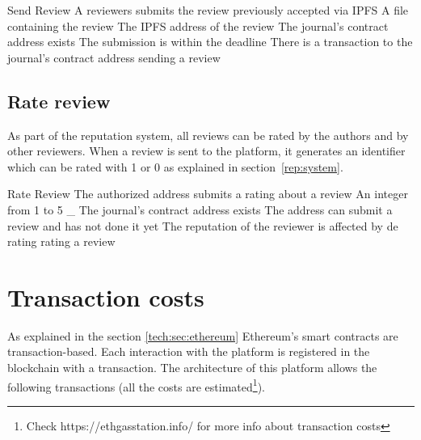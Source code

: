 {Send Review}%
{A reviewers submits the review previously accepted via
  IPFS}%
{A file containing the review}%
{The IPFS address of the review}%
{The journal's contract address exists}%
{The submission is within the deadline}%
{There is a transaction to the journal's contract address}%
{sending a review}%

\subsection*{Rate review}

As part of the reputation system, all reviews can be rated by the authors and by
other reviewers. When a review is sent to the platform, it generates an
identifier which can be rated with 1 or 0 as explained in
section~\ref{rep:system}.

{Rate Review}%
{The authorized address submits a rating about a review}%
{An integer from 1 to 5}%
{_}%
{The journal's contract address exists}%
{The address can submit a review and has not done it yet}%
{The reputation of the reviewer is affected by de rating}%
{rating a review}%
\section{Transaction costs}
\label{arch:trans}

As explained in the section \ref{tech:sec:ethereum} Ethereum's smart contracts
are transaction-based. Each interaction with the platform is registered in the
blockchain with a transaction. The architecture of this platform allows the
following transactions (all the costs are estimated\footnote{Check
  https://ethgasstation.info/ for more info about transaction costs}).

